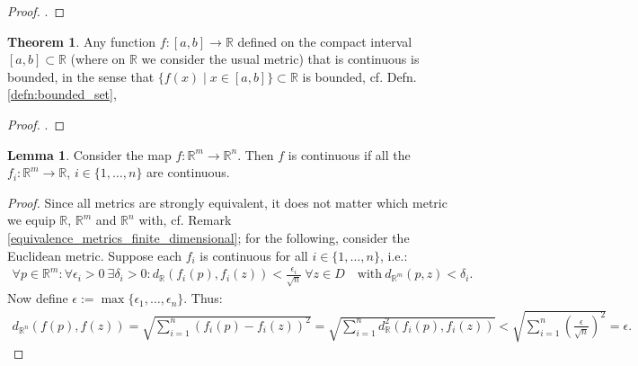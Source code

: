 \documentclass[12pt, a4paper]{article}
\numberwithin{equation}{section}
\theoremstyle{definition}
\theoremstyle{definition}
\newtheorem{lemma}[thm]{Lemma} %
\newtheorem{theorem}[thm]{Theorem}
\begin{document}
	\begin{proof}
		\cite[p. 285]{MfPI}.
	\end{proof}

	\begin{theorem}\label{thrm:continuous_functions_bounded_on_compact_interval}
		Any function $f: [a, b]\to\mathbb R$ defined on the compact interval \\ $[a, b] \subset \mathbb R$ (where on $\mathbb R$ we consider the usual metric) that is continuous is bounded, in the sense that $\{ f(x) \mid x\in [a, b] \} \subset \mathbb R$ is bounded, cf. Defn. \ref{defn:bounded_set}, 
	\end{theorem}

	\begin{proof}
		\cite[p. 161]{MfPI}.
	\end{proof}

	\begin{lemma}\label{continuity_vector_components}
		Consider the map $f: \mathbb R^m\rightarrow\mathbb R^n$. Then $f$ is continuous if all the $f_i: \mathbb R^m\rightarrow\mathbb R$, $i\in\{1, \dots, n\}$ are continuous. 
	\end{lemma}
	\begin{proof}
		Since all metrics are strongly equivalent, it does not matter which metric we equip $\mathbb R$, $\mathbb R^m$ and $\mathbb R^n$ with, cf. Remark \ref{equivalence_metrics_finite_dimensional}; for the following, consider the Euclidean metric. Suppose each $f_i$ is continuous for all $i\in \{1, \dots, n\}$, i.e.: 
		\begin{align} 
			\forall p\in\mathbb R^m: \forall \epsilon_i > 0 \ \exists 
			\delta_i>0: d_{\mathbb R}(f_i(p), f_i(z)) < \frac{\epsilon_i}{\sqrt{n}} \ \forall z\in D \quad \text{with}\ d_{\mathbb R^m}(p, z) < \delta_i. 
		\end{align} 
		Now define $\epsilon:= \max\{\epsilon_1, \dots, \epsilon_n\}$. Thus: 
		\begin{align}
			d_{\mathbb R^n}(f(p), f(z)) = \sqrt{\sum_{i=1}^{n}\left(f_i(p)-f_i(z)\right)^2} 
			= \sqrt{\sum_{i=1}^{n}d^2_{\mathbb R}\left(f_i(p), f_i(z)\right)} < \sqrt{\sum_{i=1}^{n}\left(\frac{\epsilon}{\sqrt{n}}\right)^2} = \epsilon. 
		\end{align}
	\end{proof}
	
\end{document}
